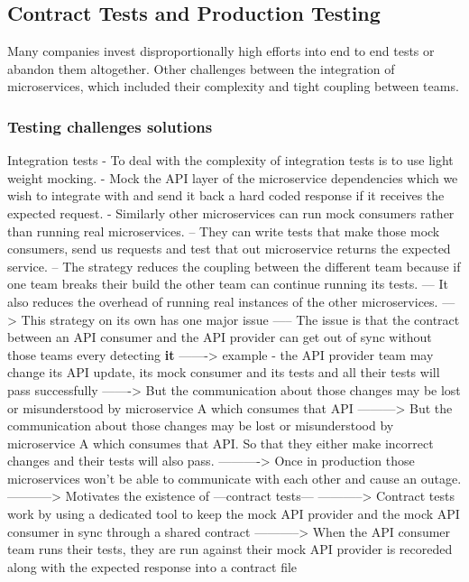 \documentclass[a4paper, 11pt]{book}
\begin{document}
    \subsection{Contract Tests and Production Testing}
    Many companies invest disproportionally high efforts into end to end tests or abandon them altogether.
    Other challenges between the integration of microservices, which included their complexity and tight coupling between teams.

    \subsubsection{Testing challenges solutions}
    Integration tests
    - To deal with the complexity of integration tests is to use light weight mocking.
    - Mock the API layer of the microservice dependencies which we wish to integrate with and send it back a hard coded response if it receives the expected request.
    - Similarly other microservices can run mock consumers rather than running real microservices.
    -- They can write tests that make those mock consumers, send us requests and test that out microservice returns the expected service.
    -- The strategy reduces the coupling between the different team because if one team breaks their build the other team can continue running its tests.
    --- It also reduces the overhead of running real instances of the other microservices.
    ---> This strategy on its own has one major issue
    ----- The issue is that the contract between an API consumer and the API provider can get out of sync without those teams every detecting \textbf{it}
    -------> example - the API provider team may change its API update, its mock consumer and its tests and all their tests will pass successfully
    -------> But the communication about those changes may be lost or misunderstood by microservice A which consumes that API
    ---------> But the communication about those changes may be lost or misunderstood by microservice A which consumes that API. So that they either make incorrect changes and their tests will also pass.
    ----------> Once in production those microservices won't be able to communicate with each other and cause an outage.
    -----------> Motivates the existence of ---contract tests---
    -----------> Contract tests work by using a dedicated tool to keep the mock API provider and the mock API consumer in sync through a shared contract
    -----------> When the API consumer team runs their tests, they are run against their mock API provider is recoreded along with the expected response into a contract file
\end{document}
